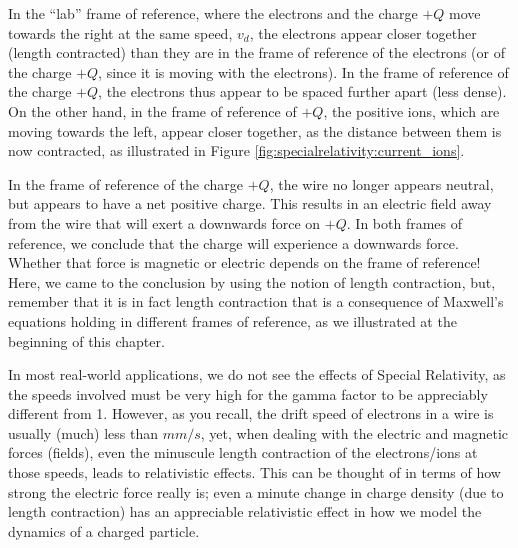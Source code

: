 In the ``lab'' frame of reference, where the electrons and the charge $+Q$ move towards the right at the same speed, $v_d$, the electrons appear closer together (length contracted) than they are in the frame of reference of the electrons (or of the charge $+Q$, since it is moving with the electrons). In the frame of reference of the charge $+Q$, the electrons thus appear to be spaced further apart (less dense). On the other hand, in the frame of reference of $+Q$, the positive ions, which are moving towards the left, appear closer together, as the distance between them is now contracted, as illustrated in Figure \ref{fig:specialrelativity:current_ions}.

In the frame of reference of the charge $+Q$, the wire no longer appears neutral, but appears to have a net positive charge. This results in an electric field away from the wire that will exert a downwards force on $+Q$. In both frames of reference, we conclude that the charge will experience a downwards force. Whether that force is magnetic or electric depends on the frame of reference! Here, we came to the conclusion by using the notion of length contraction, but, remember that it is in fact length contraction that is a consequence of Maxwell's equations holding in different frames of reference, as we illustrated at the beginning of this chapter. 

In most real-world applications, we do not see the effects of Special Relativity, as the speeds involved must be very high for the gamma factor to be appreciably different from 1. However, as you recall, the drift speed of electrons in a wire is usually (much) less than $\si{mm/s}$, yet, when dealing with the electric and magnetic forces (fields), even the minuscule length contraction of the electrons/ions at those speeds, leads to relativistic effects. This can be thought of in terms of how strong the electric force really is; even a minute change in charge density (due to length contraction) has an appreciable relativistic effect in how we model the dynamics of a charged particle.

